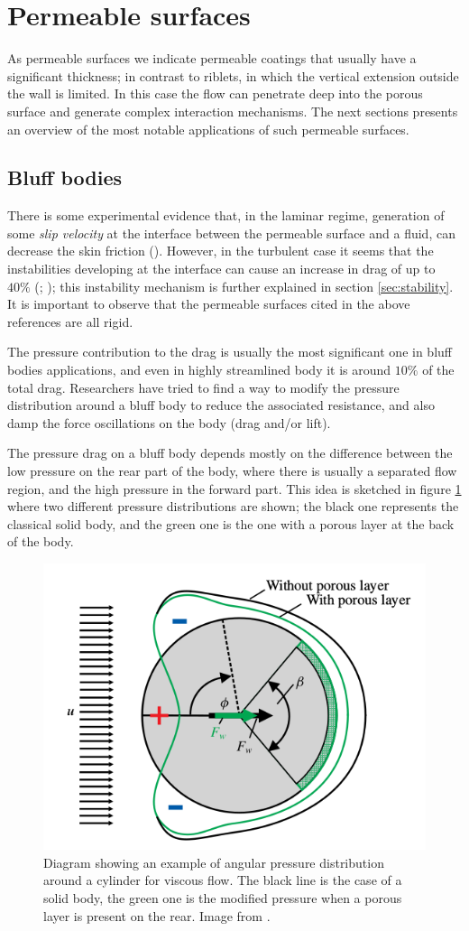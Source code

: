 \section{Permeable surfaces}
As permeable surfaces we indicate permeable coatings that usually have a significant thickness; in contrast to riblets, in which the vertical extension outside the wall is limited.
In this case the flow can penetrate deep into the porous surface and generate complex interaction mechanisms.
The next sections presents an overview of the most notable applications of such permeable surfaces.

\subsection{Bluff bodies}

There is some experimental evidence that, in the laminar regime, generation of some \textit{slip velocity} at the interface between the permeable surface and a fluid, can decrease the skin friction (\citet{beaver}).
However, in the turbulent case it seems that the instabilities developing at the interface can cause an increase in drag of up to $40\%$ (\citet{jimenez2001turbulent}; \citet{breugem2006influence}); this instability mechanism is further explained in section \ref{sec:stability}.
It is important to observe that the permeable surfaces cited in the above references are all rigid.

The pressure contribution to the drag is usually the most significant one in bluff bodies applications, and even in highly streamlined body it is around $10\%$ of the total drag.
Researchers have tried to find a way to modify the pressure distribution around a bluff body to reduce the associated resistance, and also damp the force oscillations on the body (drag and/or lift).

The pressure drag on a bluff body depends mostly on the difference between the low pressure on the rear part of the body, where there is usually a separated flow region, and the high pressure in the forward part.
This idea is sketched in figure \ref{fig:pressure_dist} where two different pressure distributions are shown; the black one represents the classical solid body, and the green one is the one with a porous layer at the back of the body.

\begin{figure}[h]
	\centering
	\includegraphics[width=0.4\linewidth]{chapter_1/pressure_dist}
	\caption{Diagram showing an example of angular pressure distribution around a cylinder for viscous flow. The black line is the case of a solid body, the green one is the modified pressure when a porous layer is present on the rear. Image from \citet{klausmann2017drag}.}
	\label{fig:pressure_dist}
\end{figure}

